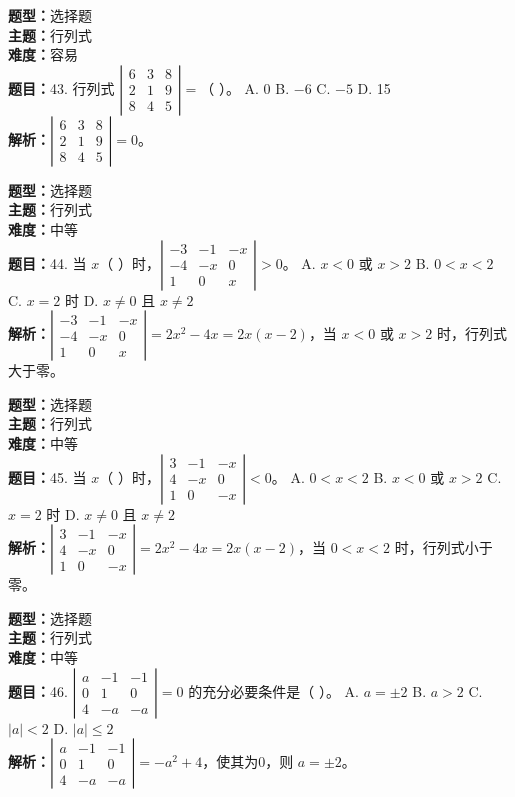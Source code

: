 \documentclass{ctexart}
\newenvironment{question}[5]{%
	\noindent\textbf{题型：}#1\\
	\textbf{主题：}#2\\
	\textbf{难度：}#3\\
	\textbf{题目：}#4\\
	\textbf{解析：}#5\\
	\vspace{1em}
}{}
\begin{document}
\begin{question}
	{选择题}
	{行列式}
	{容易}
	{43. 行列式 $\left|\begin{array}{lll}6 & 3 & 8 \\ 2 & 1 & 9 \\ 8 & 4 & 5\end{array}\right|=$（ ）。
		A. 0 \quad B. $-6$ \quad C. $-5$ \quad D. 15}
	{$\left|\begin{array}{lll}6 & 3 & 8 \\ 2 & 1 & 9 \\ 8 & 4 & 5\end{array}\right|=0$。}
\end{question}

\begin{question}
	{选择题}
	{行列式}
	{中等}
	{44. 当 $x$（ ）时，$\left|\begin{array}{ccc}-3 & -1 & -x \\ -4 & -x & 0 \\ 1 & 0 & x\end{array}\right|>0$。
		A. $x<0$ 或 $x>2$ \quad B. $0<x<2$ \quad C. $x=2$ 时 \quad D. $x\neq0$ 且 $x\neq2$}
	{$\left|\begin{array}{ccc}-3 & -1 & -x \\ -4 & -x & 0 \\ 1 & 0 & x\end{array}\right|=2x^2 - 4x = 2x(x - 2)$，当 $x<0$ 或 $x>2$ 时，行列式大于零。}
\end{question}

\begin{question}
	{选择题}
	{行列式}
	{中等}
	{45. 当 $x$（ ）时，$\left|\begin{array}{ccc}3 & -1 & -x \\ 4 & -x & 0 \\ 1 & 0 & -x\end{array}\right|<0$。
		A. $0<x<2$ \quad B. $x<0$ 或 $x>2$ \quad C. $x=2$ 时 \quad D. $x\neq0$ 且 $x\neq2$}
	{$\left|\begin{array}{ccc}3 & -1 & -x \\ 4 & -x & 0 \\ 1 & 0 & -x\end{array}\right|=2x^2 - 4x = 2x(x - 2)$，当 $0<x<2$ 时，行列式小于零。}
\end{question}

\begin{question}
	{选择题}
	{行列式}
	{中等}
	{46. $\left|\begin{array}{ccc}a & -1 & -1 \\ 0 & 1 & 0 \\ 4 & -a & -a\end{array}\right|=0$ 的充分必要条件是（ ）。
		A. $a=\pm2$ \quad B. $a>2$ \quad C. $|a|<2$ \quad D. $|a|\leq2$}
	{$\left|\begin{array}{ccc}a & -1 & -1 \\ 0 & 1 & 0 \\ 4 & -a & -a\end{array}\right| = -a^2 + 4$，使其为0，则 $a=\pm2$。}
\end{question}
\end{document}
